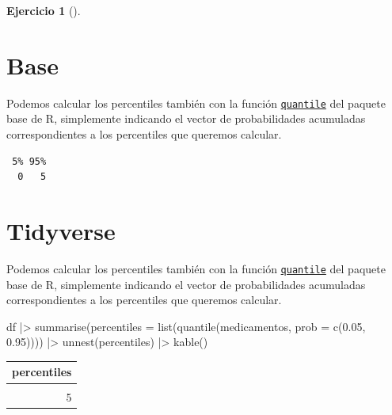 \documentclass[
  a4paper,
]{scrreport}
\newenvironment{Shaded}{\begin{snugshade}}{\end{snugshade}}
\newcommand{\AttributeTok}[1]{\textcolor[rgb]{0.40,0.45,0.13}{#1}}
\newcommand{\FloatTok}[1]{\textcolor[rgb]{0.68,0.00,0.00}{#1}}
\newcommand{\FunctionTok}[1]{\textcolor[rgb]{0.28,0.35,0.67}{#1}}
\newcommand{\NormalTok}[1]{\textcolor[rgb]{0.00,0.23,0.31}{#1}}
\newcommand{\SpecialCharTok}[1]{\textcolor[rgb]{0.37,0.37,0.37}{#1}}
\theoremstyle{definition}
\newtheorem{exercise}{Ejercicio}[chapter]
\theoremstyle{remark}
\begin{document}
\begin{exercise}[]
\begin{enumerate}
\begin{tcolorbox}
  \section{Base}

  Podemos calcular los percentiles también con la función
  \href{https://www.rdocumentation.org/packages/base/versions/3.6.2/topics/quantile}{\texttt{quantile}}
  del paquete base de R, simplemente indicando el vector de
  probabilidades acumuladas correspondientes a los percentiles que
  queremos calcular.

\begin{Shaded}
\end{Shaded}

\begin{verbatim}
 5% 95% 
  0   5 
\end{verbatim}

  \section{Tidyverse}

  Podemos calcular los percentiles también con la función
  \href{https://www.rdocumentation.org/packages/base/versions/3.6.2/topics/quantile}{\texttt{quantile}}
  del paquete base de R, simplemente indicando el vector de
  probabilidades acumuladas correspondientes a los percentiles que
  queremos calcular.

\begin{Shaded}
\begin{Highlighting}[]
\NormalTok{df }\SpecialCharTok{|\textgreater{}} \FunctionTok{summarise}\NormalTok{(}\AttributeTok{percentiles =} \FunctionTok{list}\NormalTok{(}\FunctionTok{quantile}\NormalTok{(medicamentos, }\AttributeTok{prob =} \FunctionTok{c}\NormalTok{(}\FloatTok{0.05}\NormalTok{, }\FloatTok{0.95}\NormalTok{)))) }\SpecialCharTok{|\textgreater{}}
    \FunctionTok{unnest}\NormalTok{(percentiles) }\SpecialCharTok{|\textgreater{}} 
    \FunctionTok{kable}\NormalTok{()}
\end{Highlighting}
\end{Shaded}

  \begin{longtable}[]{@{}r@{}}
  \toprule\noalign{}
  percentiles \\
  \midrule\noalign{}
  \endhead
  \bottomrule\noalign{}
  \endlastfoot
  0 \\
  5 \\
  \end{longtable}


\end{tcolorbox}
\end{enumerate}
\end{exercise}
\end{document}
